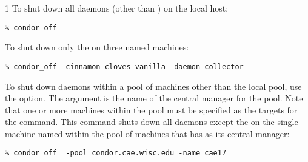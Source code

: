 \begin{ManPage}{\label{man-condor-off}}{1}
\Examples
To shut down all daemons (other than ) on the
local host:
\begin{verbatim}
% condor_off
\end{verbatim}

To shut down only the  on three named machines:
\begin{verbatim}
% condor_off  cinnamon cloves vanilla -daemon collector
\end{verbatim}

To shut down daemons within a pool of machines other than the
local pool, use the  option.
The argument is the name of the central manager for the pool.
Note that one or more machines within the pool must be
specified as the targets for the command.
This command shuts down all daemons except the 
on the single machine named  within the
pool of machines that has  as
its central manager:
\begin{verbatim}
% condor_off  -pool condor.cae.wisc.edu -name cae17
\end{verbatim}

\end{ManPage}
